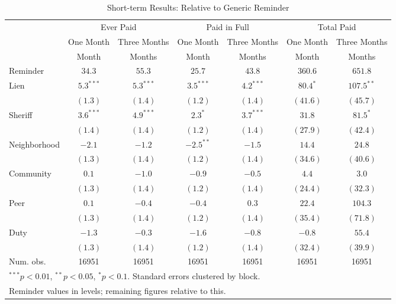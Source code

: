 \begin{table}[htbp]
\caption{Short-term Results: Relative to Generic Reminder}
\begin{center}
\begin{tabular}{l c c c c c c }
\hline
 & \multicolumn{2}{c}{Ever Paid} & \multicolumn{2}{c}{Paid in Full} & \multicolumn{2}{c}{Total Paid} \\
 & One Month & Three Months & One Month & Three Months & One Month & Three Months \\
 & Month & Months & Month & Months & Month & Months \\
\hline
Reminder     & $34.3$ & $55.3$ & $25.7$ & $43.8$ & $360.6$ & $651.8$ \\
\hline
Lien         & $5.3^{***}$  & $5.3^{***}$  & $3.5^{***}$  & $4.2^{***}$  & $80.4^{*}$    & $107.5^{**}$  \\
             & $(1.3)$      & $(1.4)$      & $(1.2)$      & $(1.4)$      & $(41.6)$      & $(45.7)$      \\
Sheriff      & $3.6^{***}$  & $4.9^{***}$  & $2.3^{*}$    & $3.7^{***}$  & $31.8$        & $81.5^{*}$    \\
             & $(1.4)$      & $(1.4)$      & $(1.2)$      & $(1.4)$      & $(27.9)$      & $(42.4)$      \\
Neighborhood & $-2.1$       & $-1.2$       & $-2.5^{**}$  & $-1.5$       & $14.4$        & $24.8$        \\
             & $(1.3)$      & $(1.4)$      & $(1.2)$      & $(1.4)$      & $(34.6)$      & $(40.6)$      \\
Community    & $0.1$        & $-1.0$       & $-0.9$       & $-0.5$       & $4.4$         & $3.0$         \\
             & $(1.3)$      & $(1.4)$      & $(1.2)$      & $(1.4)$      & $(24.4)$      & $(32.3)$      \\
Peer         & $0.1$        & $-0.4$       & $-0.4$       & $0.3$        & $22.4$        & $104.3$       \\
             & $(1.3)$      & $(1.4)$      & $(1.2)$      & $(1.4)$      & $(35.4)$      & $(71.8)$      \\
Duty         & $-1.3$       & $-0.3$       & $-1.6$       & $-0.8$       & $-0.8$        & $55.4$        \\
             & $(1.3)$      & $(1.4)$      & $(1.2)$      & $(1.4)$      & $(32.4)$      & $(39.9)$      \\
\hline
Num. obs.    & 16951        & 16951        & 16951        & 16951        & 16951         & 16951         \\
\hline
\multicolumn{7}{l}{\scriptsize{$^{***}p<0.01$, $^{**}p<0.05$, $^*p<0.1$. Standard errors clustered by block.}} \\
\multicolumn{7}{l}{\scriptsize{Reminder values in levels; remaining figures relative to this.}}
\end{tabular}
\label{sh_lpm_rob}
\end{center}
\end{table}

